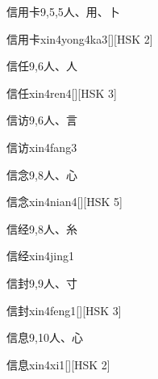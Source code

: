 \begin{entry}{信用卡}{9,5,5}{⼈、⽤、⼘}
  \begin{phonetics}{信用卡}{xin4yong4ka3}[][HSK 2]
  \end{phonetics}
\end{entry}

\begin{entry}{信任}{9,6}{⼈、⼈}
  \begin{phonetics}{信任}{xin4ren4}[][HSK 3]
  \end{phonetics}
\end{entry}

\begin{entry}{信访}{9,6}{⼈、⾔}
  \begin{phonetics}{信访}{xin4fang3}
  \end{phonetics}
\end{entry}

\begin{entry}{信念}{9,8}{⼈、⼼}
  \begin{phonetics}{信念}{xin4nian4}[][HSK 5]
  \end{phonetics}
\end{entry}

\begin{entry}{信经}{9,8}{⼈、⽷}
  \begin{phonetics}{信经}{xin4jing1}
  \end{phonetics}
\end{entry}

\begin{entry}{信封}{9,9}{⼈、⼨}
  \begin{phonetics}{信封}{xin4feng1}[][HSK 3]
  \end{phonetics}
\end{entry}

\begin{entry}{信息}{9,10}{⼈、⼼}
  \begin{phonetics}{信息}{xin4xi1}[][HSK 2]
  \end{phonetics}
\end{entry}

